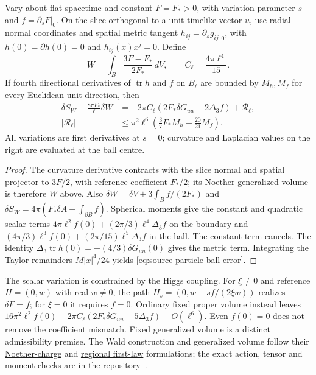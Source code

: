 \begin{proposition}
\label{prop:source-particle-generalized-volume}
Vary about flat spacetime and constant $F=F_*>0$, with variation parameter
$s$ and $f=\partial_sF|_0$. On the slice orthogonal to a unit timelike
vector $u$, use radial normal coordinates and spatial metric tangent
$h_{ij}=\partial_sg_{ij}|_0$, with $h(0)=\partial h(0)=0$ and
$h_{ij}(x)x^j=0$. Define
\[
 W=\int_B\frac{3F-F_*}{2F_*}\,dV,\qquad
 C_\ell=\frac{4\pi\ell^4}{15}.
\]
If fourth directional derivatives of $\operatorname{tr}h$ and $f$ on
$B_\ell$ are bounded by $M_h,M_f$ for every Euclidean unit direction, then
\begin{align}
 \delta S_W-\frac{8\pi F_*}{\ell}\delta W
   &=-2\pi C_\ell(2F_*\delta G_{uu}-2\Delta_3 f)+\mathcal R_\ell,
       \label{eq:source-particle-ball-identity}\\
 |\mathcal R_\ell|
   &\leq\pi^2\ell^6\left(\frac37F_*M_h+\frac{20}{21}M_f\right).
       \label{eq:source-particle-ball-error}
\end{align}
All variations are first derivatives at $s=0$; curvature and Laplacian
values on the right are evaluated at the ball centre.
\end{proposition}

\begin{proof}
The curvature derivative contracts with the slice normal and spatial
projector to $3F/2$, with reference coefficient $F_*/2$; its
Noether generalized volume is therefore $W$ above.
Also $\delta W=\delta V+3\int_Bf/(2F_*)$ and
$\delta S_W=4\pi(F_*\delta A+\int_{\partial B}f)$.
Spherical moments give the constant and quadratic scalar terms
$4\pi\ell^2f(0)+(2\pi/3)\ell^4\Delta_3f$ on the boundary and
$(4\pi/3)\ell^3f(0)+(2\pi/15)\ell^5\Delta_3f$ in the ball.
The constant term cancels. The identity
$\Delta_3\operatorname{tr}h(0)=-(4/3)\delta G_{uu}(0)$ gives the metric term.
Integrating the Taylor remainders $M|x|^4/24$ yields
\eqref{eq:source-particle-ball-error}.
\end{proof}

The scalar variation is constrained by the Higgs coupling. For $\xi\ne0$
and reference $H=(0,w)$ with real $w\ne0$, the path
$H_s=(0,w-sf/(2\xi w))$ realizes $\delta F=f$; for $\xi=0$ it requires $f=0$.
Ordinary fixed proper volume instead leaves
$16\pi^2\ell^2f(0)-2\pi C_\ell(2F_*\delta G_{uu}-5\Delta_3f)
+O(\ell^6)$. Even $f(0)=0$ does not remove the coefficient mismatch.
Fixed generalized volume is a distinct admissibility premise.
The Wald construction and generalized volume follow their
\href{https://arxiv.org/abs/gr-qc/9307038}{Noether-charge}
and \href{https://arxiv.org/abs/1612.04374}{regional first-law}
formulations; the exact action, tensor and moment checks are in the
repository~\cite{ophrepo}.

